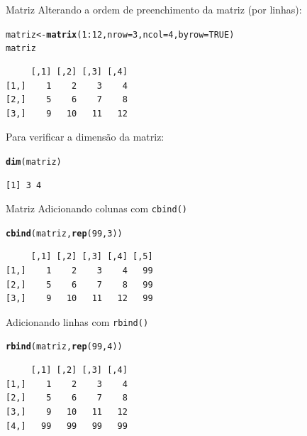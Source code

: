 \documentclass[10pt,handout]{beamer}\usepackage[]{graphicx}\usepackage[]{color}
\makeatletter
\newcommand{\hlnum}[1]{\textcolor[rgb]{0.686,0.059,0.569}{#1}}%
\newcommand{\hlopt}[1]{\textcolor[rgb]{0,0,0}{#1}}%
\newcommand{\hlstd}[1]{\textcolor[rgb]{0.345,0.345,0.345}{#1}}%
\newcommand{\hlkwb}[1]{\textcolor[rgb]{0.69,0.353,0.396}{#1}}%
\newcommand{\hlkwc}[1]{\textcolor[rgb]{0.333,0.667,0.333}{#1}}%
\newcommand{\hlkwd}[1]{\textcolor[rgb]{0.737,0.353,0.396}{\textbf{#1}}}%
\newenvironment{kframe}{%
 \def\at@end@of@kframe{}%
 \ifinner\ifhmode%
  \def\at@end@of@kframe{\end{minipage}}%
  \begin{minipage}{\columnwidth}%
 \fi\fi%
 \def\FrameCommand##1{\hskip\@totalleftmargin \hskip-\fboxsep
 \colorbox{shadecolor}{##1}\hskip-\fboxsep
     \hskip-\linewidth \hskip-\@totalleftmargin \hskip\columnwidth}%
 \MakeFramed {\advance\hsize-\width
   \@totalleftmargin\z@ \linewidth\hsize
   \@setminipage}}%
 {\par\unskip\endMakeFramed%
 \at@end@of@kframe}
\newenvironment{knitrout}{}{} %
\makeatother
\begin{document}
\begin{frame}[fragile]{Matriz}
Alterando a ordem de preenchimento da matriz (por linhas):
\begin{knitrout}\small
{}\color{fgcolor}\begin{kframe}
\begin{alltt}
\hlstd{matriz} \hlkwb{<-} \hlkwd{matrix}\hlstd{(}\hlnum{1}\hlopt{:}\hlnum{12}\hlstd{,} \hlkwc{nrow} \hlstd{=} \hlnum{3}\hlstd{,} \hlkwc{ncol} \hlstd{=} \hlnum{4}\hlstd{,} \hlkwc{byrow} \hlstd{=} \hlnum{TRUE}\hlstd{)}
\hlstd{matriz}
\end{alltt}
\begin{verbatim}
     [,1] [,2] [,3] [,4]
[1,]    1    2    3    4
[2,]    5    6    7    8
[3,]    9   10   11   12
\end{verbatim}
\end{kframe}
\end{knitrout}
Para verificar a dimensão da matriz:
\begin{knitrout}\small
{}\color{fgcolor}\begin{kframe}
\begin{alltt}
\hlkwd{dim}\hlstd{(matriz)}
\end{alltt}
\begin{verbatim}
[1] 3 4
\end{verbatim}
\end{kframe}
\end{knitrout}
\end{frame}

\begin{frame}[fragile]{Matriz}
Adicionando colunas com \verb|cbind()|
\begin{knitrout}\small
{}\color{fgcolor}\begin{kframe}
\begin{alltt}
\hlkwd{cbind}\hlstd{(matriz,} \hlkwd{rep}\hlstd{(}\hlnum{99}\hlstd{,} \hlnum{3}\hlstd{))}
\end{alltt}
\begin{verbatim}
     [,1] [,2] [,3] [,4] [,5]
[1,]    1    2    3    4   99
[2,]    5    6    7    8   99
[3,]    9   10   11   12   99
\end{verbatim}
\end{kframe}
\end{knitrout}
Adicionando linhas com \verb|rbind()|
\begin{knitrout}\small
{}\color{fgcolor}\begin{kframe}
\begin{alltt}
\hlkwd{rbind}\hlstd{(matriz,} \hlkwd{rep}\hlstd{(}\hlnum{99}\hlstd{,} \hlnum{4}\hlstd{))}
\end{alltt}
\begin{verbatim}
     [,1] [,2] [,3] [,4]
[1,]    1    2    3    4
[2,]    5    6    7    8
[3,]    9   10   11   12
[4,]   99   99   99   99
\end{verbatim}
\end{kframe}
\end{knitrout}
\end{frame}
\end{document}
